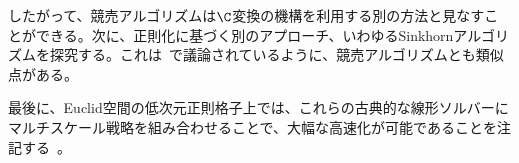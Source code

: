 したがって、競売アルゴリズムは$\C$変換の機構を利用する別の方法と見なすことができる。次に、正則化に基づく別のアプローチ、いわゆるSinkhornアルゴリズムを探究する。これは~\citep{schmitzer2016stabilized}で議論されているように、競売アルゴリズムとも類似点がある。
%

最後に、Euclid空間の低次元正則格子上では、これらの古典的な線形ソルバーにマルチスケール戦略を組み合わせることで、大幅な高速化が可能であることを注記する~\citep{schmitzer2016sparse,oberman2015efficient}。




